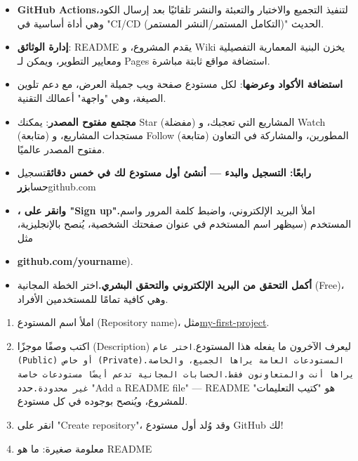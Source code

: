 \begin{itemize}
  \item \textbf{GitHub Actions}لتنفيذ التجميع والاختبار والتعبئة والنشر تلقائيًا بعد إرسال الكود، وهي أداة أساسية في "CI/CD (التكامل المستمر/النشر المستمر)" الحديث.
  \item \textbf{إدارة الوثائق}: README يقدم المشروع، و Wiki يخزن البنية المعمارية التفصيلية ومعايير التطوير، ويمكن لـ Pages استضافة مواقع ثابتة مباشرة.
  \item \textbf{استضافة الأكواد وعرضها}: لكل مستودع صفحة ويب جميلة العرض، مع دعم تلوين الصيغة، وهي "واجهة" أعمالك التقنية.
  \item \textbf{مجتمع مفتوح المصدر}: يمكنك Star (مفضلة) المشاريع التي تعجبك، و Watch (متابعة) مستجدات المشاريع، و Follow (متابعة) المطورين، والمشاركة في التعاون مفتوح المصدر عالميًا.
  \item \textbf{رابعًا: التسجيل والبدء — أنشئ أول مستودع لك في خمس دقائق}تسجيل حساب\textbf{زر}github.com
  \item \textbf{، وانقر على "Sign up".}املأ البريد الإلكتروني، واضبط كلمة المرور واسم المستخدم (سيظهر اسم المستخدم في عنوان صفحتك الشخصية، يُنصح بالإنجليزية، مثل
  \item \textbf{github.com/yourname}).
  \item \textbf{أكمل التحقق من البريد الإلكتروني والتحقق البشري.}اختر الخطة المجانية (Free)، وهي كافية تمامًا للمستخدمين الأفراد.
\end{itemize}



\begin{enumerate}
  \item املأ اسم المستودع (Repository name)، مثل\href{https://github.com}{my-first-project}.
  \item اكتب وصفًا موجزًا (Description) ليعرف الآخرون ما يفعله هذا المستودع.\texttt{اختر عام (Public) أو خاص (Private).\allowbreak  المستودعات العامة يراها الجميع، والخاصة يراها أنت والمتعاونون فقط.\allowbreak  الحسابات المجانية تدعم أيضًا مستودعات خاصة غير محدودة.\allowbreak }حدد "Add a README file" — README هو "كتيب التعليمات" للمشروع، ويُنصح بوجوده في كل مستودع.
  \item انقر على "Create repository"، وقد وُلد أول مستودع GitHub لك!
  \item معلومة صغيرة: ما هو README
\end{enumerate}


